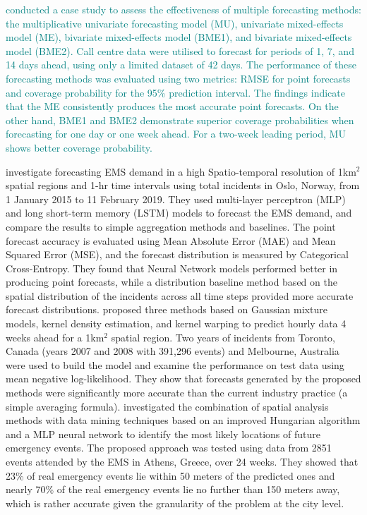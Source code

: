 \documentclass[
  authoryear,
  preprint,
  3p]{elsarticle}
\begin{document}
\textcolor{teal}{conducted a case study to assess the effectiveness of multiple forecasting methods: the multiplicative univariate forecasting model (MU), univariate mixed-effects model (ME), bivariate mixed-effects model (BME1), and bivariate mixed-effects model (BME2). Call centre data were utilised to forecast for periods of 1, 7, and 14 days ahead, using only a limited dataset of 42 days. The performance of these forecasting methods was evaluated using two metrics: RMSE for point forecasts and coverage probability for the 95\% prediction interval. The findings indicate that the ME consistently produces the most accurate point forecasts. On the other hand, BME1 and BME2 demonstrate superior coverage probabilities when forecasting for one day or one week ahead. For a two-week leading period, MU shows better coverage probability.}

\citet{9659837} investigate forecasting EMS demand in a high
Spatio-temporal resolution of 1km\(^2\) spatial regions and 1-hr time
intervals using total incidents in Oslo, Norway, from 1 January 2015 to
11 February 2019. They used multi-layer perceptron (MLP) and long
short-term memory (LSTM) models to forecast the EMS demand, and compare
the results to simple aggregation methods and baselines. The point
forecast accuracy is evaluated using Mean Absolute Error (MAE) and Mean
Squared Error (MSE), and the forecast distribution is measured by
Categorical Cross-Entropy. They found that Neural Network models
performed better in producing point forecasts, while a distribution
baseline method based on the spatial distribution of the incidents
across all time steps provided more accurate forecast distributions.
\citet{zhou2016predictinglit} proposed three methods based on Gaussian
mixture models, kernel density estimation, and kernel warping to predict
hourly data 4 weeks ahead for a 1km\(^2\) spatial region. Two years of
incidents from Toronto, Canada (years 2007 and 2008 with 391,296 events)
and Melbourne, Australia were used to build the model and examine the
performance on test data using mean negative log-likelihood. They show
that forecasts generated by the proposed methods were significantly more
accurate than the current industry practice (a simple averaging
formula). \citet{grekousis2019will} investigated the combination of
spatial analysis methods with data mining techniques based on an
improved Hungarian algorithm and a MLP neural network to identify the
most likely locations of future emergency events. The proposed approach
was tested using data from 2851 events attended by the EMS in Athens,
Greece, over 24 weeks. They showed that 23\% of real emergency events
lie within 50 meters of the predicted ones and nearly 70\% of the real
emergency events lie no further than 150 meters away, which is rather
accurate given the granularity of the problem at the city level.
\end{document}

